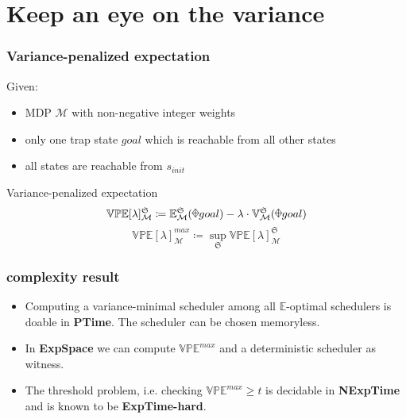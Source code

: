 \documentclass[onlymath]{beamer}
\begin{document}
\section{Keep an eye on the variance}

\begin{frame}
	\frametitle{Variance-penalized expectation}
	Given:
	\begin{itemize}
		\item MDP $\mathcal{M}$ with non-negative integer weights \pause
		\item only one trap state $goal$ which is reachable from all other states \pause
		\item all states are reachable from $s_{init}$
	\end{itemize} \pause
	\begin{block}{Variance-penalized expectation}
		\[
		\mathbb{VPE}[\lambda]_{\mathcal{M}}^{\mathfrak{S}} \coloneqq \mathbb{E}_{\mathcal{M}}^{\mathfrak{S}}(\rawdiaplus goal) - \lambda \cdot \mathbb{V}_{\mathcal{M}}^{\mathfrak{S}}(\rawdiaplus goal)
		\] \pause
		\[
		\mathbb{VPE}[\lambda]_{\mathcal{M}}^{max} \coloneqq \sup_{\mathfrak{S}} \mathbb{VPE}[\lambda]_{\mathcal{M}}^{\mathfrak{S}}
		\]
	\end{block}
\end{frame}

\begin{frame}
	\frametitle{complexity result}
	\begin{itemize}
		\item Computing a variance-minimal scheduler among all $\mathbb{E}$-optimal schedulers is doable in \textbf{PTime}. The scheduler can be chosen memoryless. \pause
		\item In \textbf{ExpSpace} we can compute $\mathbb{VPE}^{max}$ and a deterministic scheduler as witness. \pause
		\item The threshold problem, i.e. checking $\mathbb{VPE}^{max} \geq t$ is decidable in \textbf{NExpTime} and is known to be \textbf{ExpTime-hard}.
	\end{itemize}
\end{frame}
\end{document}
